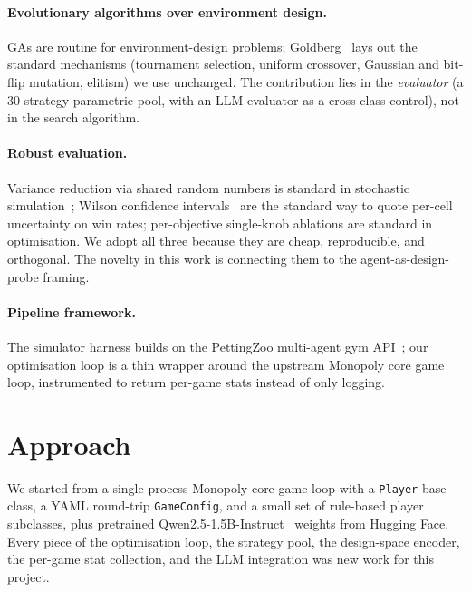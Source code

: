 \documentclass[10pt]{article}
\begin{document}
\paragraph{Evolutionary algorithms over environment design.}
GAs are routine for environment-design problems;
Goldberg~\cite{ga-goldberg} lays out the standard mechanisms
(tournament selection, uniform crossover, Gaussian and bit-flip
mutation, elitism) we use unchanged. The contribution lies in the
\emph{evaluator} (a 30-strategy parametric pool, with an LLM
evaluator as a cross-class control), not in the search algorithm.

\paragraph{Robust evaluation.} Variance reduction via shared random
numbers is standard in stochastic simulation~\cite{crn}; Wilson
confidence intervals~\cite{wilson} are the standard way to quote
per-cell uncertainty on win rates; per-objective single-knob
ablations are standard in optimisation. We adopt all three because
they are cheap, reproducible, and orthogonal. The novelty in this
work is connecting them to the agent-as-design-probe framing.

\paragraph{Pipeline framework.} The simulator harness builds on the
PettingZoo multi-agent gym API~\cite{pettingzoo}; our optimisation
loop is a thin wrapper around the upstream Monopoly core game loop,
instrumented to return per-game stats instead of only logging.

\section{Approach}\label{sec:approach}

We started from a single-process Monopoly core game loop with a
\texttt{Player} base class, a YAML round-trip \texttt{GameConfig}, and
a small set of rule-based player subclasses, plus pretrained
Qwen2.5-1.5B-Instruct~\cite{qwen25} weights from Hugging Face. Every
piece of the optimisation loop, the strategy pool, the design-space
encoder, the per-game stat collection, and the LLM integration was new
work for this project.
\end{document}
